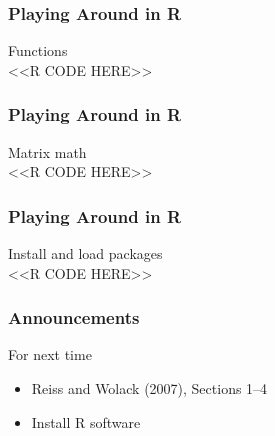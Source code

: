 \documentclass{beamer}
\begin{document}
\begin{frame}[fragile]\frametitle{Playing Around in R}
    Functions \\
    <<R CODE HERE>>
\end{frame}

\begin{frame}[fragile]\frametitle{Playing Around in R}
    Matrix math \\
    <<R CODE HERE>>
\end{frame}

\begin{frame}[fragile]\frametitle{Playing Around in R}
    Install and load packages \\
    <<R CODE HERE>>
\end{frame}

\begin{frame}\frametitle{Announcements}
    For next time
    \begin{itemize}
        \item Reiss and Wolack (2007), Sections 1--4
        \item Install R software
    \end{itemize}
\end{frame}
\end{document}
